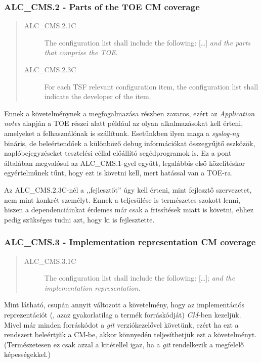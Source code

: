 \pagebreak[3]
\subsubsection{ALC\_CMS.2 - Parts of the TOE CM coverage}
\begin{quote}
    \begin{description}
        \item[ALC\_CMS.2.1C]{The configuration list shall include the following: [\ldots] \emph{and
            the parts that comprise the TOE}.}
        \item[ALC\_CMS.2.3C]{For each TSF relevant configuration item, the configuration list shall
            indicate the developer of the item.}
    \end{description}
\end{quote}

Ennek a követelménynek a megfogalmazása részben zavaros, ezért az \emph{Application notes} alapján
a TOE részei alatt például az olyan alkalmazásokat kell érteni, amelyeket a felhasználónak is
szállítunk. Esetünkben ilyen maga a \emph{syslog-ng} bináris, de beleértendőek a különböző
debug információkat összegyűjtő eszközök, naplóbejegyzéseket tesztelési céllal előállító
segédprogramok is. Ez a pont általában megvalósul az ALC\_CMS.1-gyel együtt, legalábbis első
közelítéskor egyértelműnek tűnt, hogy ezt is követni kell, mert hatással van a TOE-ra.

Az ALC\_CMS.2.3C-nél a ,,fejlesztőt'' úgy kell érteni, mint fejlesztő szervezetet, nem mint konkrét
személyt. Ennek a teljesülése is természetes szokott lenni, hiszen a dependenciáinkat érdemes
már csak a frissítések miatt is követni, ehhez pedig szükséges tudni azt, hogy ki is fejlesztette.

\pagebreak[3]
\subsubsection{ALC\_CMS.3 - Implementation representation CM coverage}
\begin{quote}
    \begin{description}
        \item[ALC\_CMS.3.1C]{The configuration list shall include the following: [\ldots];
            \emph{and the implementation representation}.}
    \end{description}
\end{quote}

Mint látható, csupán annyit változott a követelmény, hogy az implementációs reprezentációt (, azaz
gyakorlatilag a termék forráskódját) \emph{CM}-ben kezeljük. Mivel már minden forráskódot
a \emph{git} verziókezelővel követünk, ezért ha ezt a rendszert beleértjük a CM-be, akkor könnyedén
teljesíthetjük ezt a követelményt. (Természetesen ez csak azzal a kitétellel igaz, ha a \emph{git}
rendelkezik a megfelelő képességekkel.)

